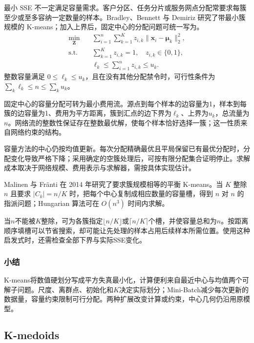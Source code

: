 最小 SSE 不一定满足容量需求。客户分区、任务分片或服务网点分配常要求每簇至少或至多容纳一定数量的样本。Bradley、Bennett 与 Demiriz 研究了带最小簇规模的 K-means；加入上界后，固定中心的分配问题可统一写为。
\begin{equation}
 \begin{aligned}
 \min_{\bm{Z}}\quad&
   \sum_{i=1}^n\sum_{k=1}^K
   z_{i,k}\lVert\bm{x}_i-\bm{\mu}_k\rVert_2^2,\\
 \text{s.t.}\quad&
   \sum_{k=1}^K z_{i,k}=1,\quad z_{i,k}\in\{0,1\},\\
 & \ell_k\leq\sum_{i=1}^n z_{i,k}\leq u_k.
 \end{aligned}
 \label{eq:clustering-capacity}
\end{equation}
整数容量满足 $0\leq\ell_k\leq u_k$，且在没有其他分配禁令时，可行性条件为 $\sum_k\ell_k\leq n\leq\sum_ku_k$。

固定中心的容量分配可转为最小费用流。源点到每个样本的边容量为1，样本到每簇的边容量为1、费用为平方距离，簇到汇点的边下界为$\ell_k$、上界为$u_k$，总流量为$n$。网络流的整数性保证存在整数最优解，使每个样本恰好选择一簇；这一性质来自网络约束的结构。

容量方法的中心仍按均值更新。每次分配精确最优且平局保留已有最优分配时，分配变化导致严格下降；采用确定的空簇处理后，可按有限分配集合证明停止。求解成本取决于网络规模、费用表示与求解器，需按具体实现估计。

Malinen 与 Fränti 在 2014 年研究了要求簇规模相等的平衡 K-means。当 $K$ 整除 $n$ 且要求 $|C_k|=n/K$ 时，把每个中心复制成相应数量的容量槽，得到 $n$ 对 $n$ 的指派问题；Hungarian 算法可在 $O(n^3)$ 时间内求解。

当$n$不能被$K$整除，可为各簇指定$\lfloor n/K\rfloor$或$\lceil n/K\rceil$个槽，并使容量总和为$n$。按距离顺序填槽可以节省搜索，却可能让先处理的样本占用后续样本所需位置。使用这种启发式时，还需检查全部下界与实际SSE变化。

\subsubsection{小结}

K-means将数值硬划分写成平方失真最小化，计算便利来自最近中心与均值两个可解子问题。尺度、离群点、初始化和$K$决定实际划分；Mini-Batch减少每次更新的数据量，容量约束限制可行分配。两种扩展改变计算或约束，中心几何仍沿用原模型。

\subsection{K-medoids}
\label{sec:clustering-kmedoids}

